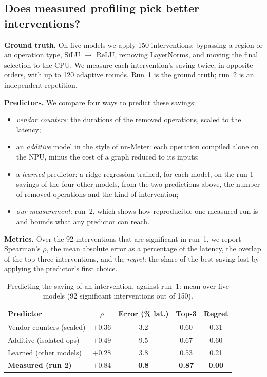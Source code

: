 \documentclass[conference]{IEEEtran}
\begin{document}
\subsection{Does measured profiling pick better interventions?}
\label{sec:eval-profiler}

\textbf{Ground truth.} On five models we apply 150 interventions: bypassing a region or an operation type, SiLU $\to$ ReLU, removing LayerNorms, and moving the final selection to the CPU. We measure each intervention's saving twice, in opposite orders, with up to 120 adaptive rounds. Run~1 is the ground truth; run~2 is an independent repetition.

\textbf{Predictors.} We compare four ways to predict these savings:
\begin{itemize}
\item \emph{vendor counters}: the durations of the removed operations, scaled to the latency;
\item an \emph{additive} model in the style of nn-Meter: each operation compiled alone on the NPU, minus the cost of a graph reduced to its inputs;
\item a \emph{learned} predictor: a ridge regression trained, for each model, on the run-1 savings of the four other models, from the two predictions above, the number of removed operations and the kind of intervention;
\item \emph{our measurement}: run~2, which shows how reproducible one measured run is and bounds what any predictor can reach.
\end{itemize}

\textbf{Metrics.} Over the 92 interventions that are significant in run~1, we report Spearman's $\rho$, the mean absolute error as a percentage of the latency, the overlap of the top three interventions, and the \emph{regret}: the share of the best saving lost by applying the predictor's first choice.

\begin{table}[t]
\caption{Predicting the saving of an intervention, against run~1: mean over five models (92 significant interventions out of 150).}
\label{tab:profiler}
\centering
\footnotesize
\begin{tabular}{@{}lcccc@{}}
\toprule
Predictor & $\rho$ & Error (\% lat.) & Top-3 & Regret \\
\midrule
Vendor counters (scaled) & $+0.36$ & 3.2 & 0.60 & 0.31 \\
Additive (isolated ops) & $+0.49$ & 9.5 & 0.67 & 0.60 \\
Learned (other models) & $+0.28$ & 3.8 & 0.53 & 0.21 \\
\textbf{Measured (run 2)} & $\mathbf{+0.84}$ & \textbf{0.8} & \textbf{0.87} & \textbf{0.00} \\
\bottomrule
\end{tabular}
\end{table}
\end{document}
